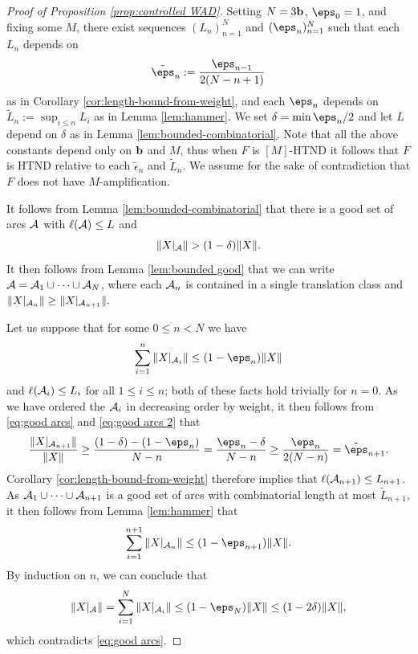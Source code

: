 \documentclass[12pt]{amsart}
\begin{document}
\begin{proof}[Proof of Proposition \ref{prop:controlled WAD}]
	Setting $N = 3\bound$,  $\eps_0 = 1$, and fixing some $M$, there exist sequences $(L_n)_{n=1}^N$ and $(\eps_n)_{n=1}^N$ such that each $L_n$ depends on $$\tilde\eps_n:=\frac{\eps_{n-1}}{2(N-n+1)}$$ as in Corollary \ref{cor:length-bound-from-weight}, and each $\eps_n$ depends on $\tilde{L}_n:=\sup_{i\leq n}L_i$ as in Lemma \ref{lem:hammer}. We set $\delta= \min \eps_n/2$ 
	and let $L$ depend on $\delta$ as in Lemma \ref{lem:bounded-combinatorial}. Note that all the above constants depend only on $\bound$ and $M$, thus when $F$ is $[M]$-HTND it follows that $F$ is HTND relative to each $\tilde \epsilon_n$ and $\tilde L_n$.
	We assume for the sake of contradiction that $F$ does not have $M$-amplification.
	
	It follows from Lemma \ref{lem:bounded-combinatorial} that there is a good set of arcs $\AA$  with $\ell(\AA)\leq L$ and
	\begin{equation}\label{eq:good arcs}
		\|X|_\AA\|> (1-\delta) \|\xhv\|.
	\end{equation} It then follows from Lemma \ref{lem:bounded good} that we can write $\AA=\AA_1\cup \dots \cup\AA_N$, where each $\AA_n$ is contained in a single translation class and $\|X|_{\AA_n}\|\geq \|X|_{\AA_{n+1}}\|.$ 
	
	Let us suppose that for some $0\leq n < N$ we have 
	\begin{equation}\label{eq:good arcs 2}
		\sum_{i = 1}^{n}\|X|_{\AA_i}\|\leq (1-\eps_n)\|\xhv\|
	\end{equation}
	and  $\ell(\AA_i)\leq L_i$ for all $1\leq i \leq n$; both of these facts hold trivially for $n = 0$.  
	As we have ordered the $\AA_i$ in decreasing order by weight, it then follows from \eqref{eq:good arcs} and \eqref{eq:good arcs 2} that 
	$$\frac{\|X|_{\AA_{n+1}}\|}{\|\xhv\|}\geq \frac{(1-\delta)- (1-\eps_n)}{N-n}= \frac{\eps_n-\delta}{N-n}\geq \frac{\eps_n}{2(N-n)}=\tilde\eps_{n+1}.$$
	Corollary \ref{cor:length-bound-from-weight} therefore implies that $\ell(\AA_{n+1})\leq L_{n+1}$. 
	As $\AA_1\cup \cdots \cup \AA_{n+1}$ is a good set of  arcs with combinatorial length at most $\tilde L_{n+1}$, it then follows from Lemma \ref{lem:hammer} that 
	$$\sum_{i= 1}^{n+1}\|X|_{\AA_n}\|\leq(1-\eps_{n+1})\|\xhv\|.$$
	By induction on $n$, we can conclude that 
	$$\|X|_\AA\| = \sum_{i=1}^N\|X|_{\AA_i}\|\leq (1-\eps_N)\|\xhv\|\leq  (1-2\delta)\|\xhv\|,$$
	which contradicts \eqref{eq:good arcs}.
\end{proof}
\end{document}

